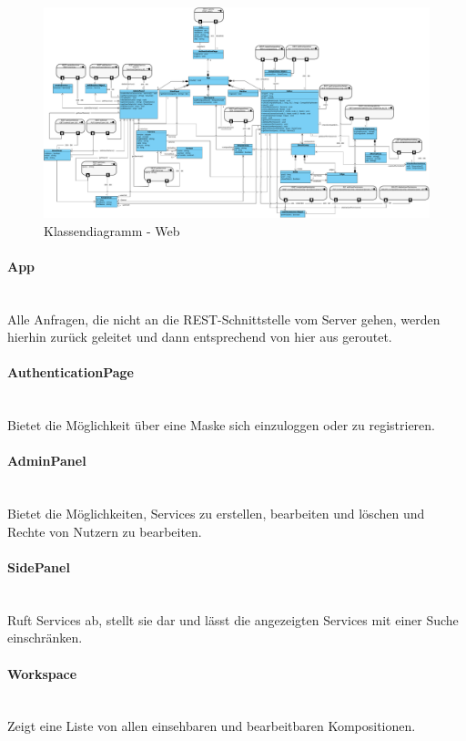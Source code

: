 \begin{figure}[!h]
	\centering
	\includegraphics[width=\textwidth]{img/Diagramme/Klassen/Frontend}
	\caption{Klassendiagramm - Web}
	\label{fig:klassendiagramm-web}
\end{figure}

\paragraph{App}\mbox{}\\
Alle Anfragen, die nicht an die REST-Schnittstelle vom Server gehen, werden hierhin zurück geleitet
und dann entsprechend von hier aus geroutet.
\paragraph{AuthenticationPage}\mbox{}\\
Bietet die Möglichkeit über eine Maske sich einzuloggen oder zu registrieren.
\paragraph{AdminPanel}\mbox{}\\
Bietet die Möglichkeiten, Services zu erstellen, bearbeiten und löschen und Rechte von Nutzern zu bearbeiten. 
\paragraph{SidePanel}\mbox{}\\
Ruft Services ab, stellt sie dar und lässt die angezeigten Services mit einer Suche einschränken. 
\paragraph{Workspace}\mbox{}\\
Zeigt eine Liste von allen einsehbaren und bearbeitbaren Kompositionen. 
